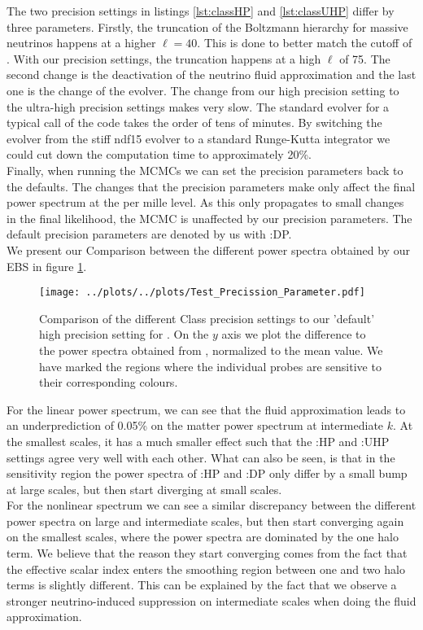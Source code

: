 \documentclass[../main.tex]{subfiles}
\begin{document}
 The two precision settings in listings \ref{lst:classHP} and \ref{lst:classUHP} differ by three parameters. Firstly, the truncation of the Boltzmann hierarchy for massive neutrinos happens at a higher $\ell=40$. This is done to better match the cutoff of \camb. With our precision settings, the truncation happens at a high $\ell$ of 75. The second change is the deactivation of the neutrino fluid approximation and the last one is the change of the evolver. The change from our high precision setting to the ultra-high precision settings makes \class very slow. The standard evolver for a typical call of the code takes the order of tens of minutes. By switching the evolver from the stiff ndf15 evolver to a standard Runge-Kutta integrator we could cut down the computation time to approximately 20\%.\\
 Finally, when running the MCMCs we can set the precision parameters back to the \class defaults. The changes that the precision parameters make only affect the final power spectrum at the per mille level. As this only propagates to small changes in the final likelihood, the MCMC is unaffected by our precision parameters. The default precision parameters are denoted by us with \class:DP.\\
 We present our Comparison between the different power spectra obtained by our EBS in figure \ref{fig:precisson_settings}.
 \begin{figure}
    \centering
    \texttt{[image: ../plots/../plots/Test\_Precission\_Parameter.pdf]}
    \caption{Comparison of the different Class precision settings to our 'default' high precision setting for \camb. On the $y$ axis we plot the difference to the power spectra obtained from \camb, normalized to the mean value. We have marked the regions where the individual probes are sensitive to their corresponding colours.}
    \label{fig:precisson_settings}
 \end{figure}  
 For the linear power spectrum, we can see that the fluid approximation leads to an underprediction of 0.05\% on the matter power spectrum at intermediate $k$. At the smallest scales, it has a much smaller effect such that the \class:HP and \class:UHP settings agree very well with each other. What can also be seen, is that in the sensitivity region the power spectra of \class:HP and \class:DP only differ by a small bump at large scales, but then start diverging at small scales.\\
 For the nonlinear spectrum we can see a similar discrepancy between the different power spectra on large and intermediate scales, but then start converging again on the smallest scales, where the power spectra are dominated by the one halo term. We believe that the reason they start converging comes from the fact that the effective scalar index enters the smoothing region between one and two halo terms is slightly different. This can be explained by the fact that we observe a stronger neutrino-induced suppression on intermediate scales when doing the fluid approximation.\\
\end{document}
